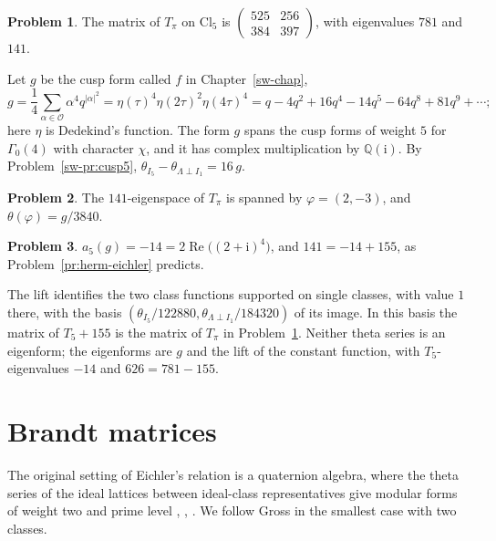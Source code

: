 \documentclass[reqno]{amsart}
\newcounter{chap}
\theoremstyle{definition}
\newtheorem{problem}{Problem}[section]
\theoremstyle{plain}
\newcommand{\Q}{\mathbb{Q}}
\newcommand{\ii}{\mathrm{i}}
\newcommand{\Oc}{\mathcal{O}}
\newcommand{\Cl}{\mathrm{Cl}}
\begin{document}
\begin{problem}\label{pr:herm-brandt}
The matrix of \(T_\pi\) on \(\Cl_5\) is \(\begin{pmatrix} 525 & 256 \\ 384 & 397 \end{pmatrix}\), with eigenvalues \(781\) and \(141\).
\end{problem}

Let \(g\) be the cusp form called \(f\) in Chapter~\ref{sw-chap}, 
\[
  g = \frac14\sum_{\alpha \in \Oc}\alpha^4 q^{\lvert\alpha\rvert^2} = \eta(\tau)^4\eta(2\tau)^2\eta(4\tau)^4 = q - 4q^2 + 16q^4 - 14q^5 - 64q^8 + 81q^9 + \cdots ;
\]
here \(\eta\) is Dedekind's function.  The form \(g\) spans the cusp forms of weight \(5\) for \(\Gamma_0(4)\) with character \(\chi\), and it has complex multiplication by \(\Q(\ii)\).  By Problem~\ref{sw-pr:cusp5}, \(\theta_{I_5} - \theta_{\Lambda \perp I_1} = 16\,g\).

\begin{problem}\label{pr:herm-theta}
The \(141\)-eigenspace of \(T_\pi\) is spanned by \(\varphi = (2, -3)\), and \(\theta(\varphi) = g/3840\).
\end{problem}

\begin{problem}\label{pr:herm-check}
\(a_5(g) = -14 = 2\operatorname{Re}\bigl((2+\ii)^4\bigr)\), and \(141 = -14 + 155\), as Problem~\ref{pr:herm-eichler} predicts.
\end{problem}

The lift identifies the two class functions supported on single classes, with value \(1\) there, with the basis \((\theta_{I_5}/122880,\theta_{\Lambda\perp I_1}/184320)\) of its image.  In this basis the matrix of \(T_5+155\) is the matrix of \(T_\pi\) in Problem~\ref{pr:herm-brandt}.  Neither theta series is an eigenform; the eigenforms are \(g\) and the lift of the constant function, with \(T_5\)-eigenvalues \(-14\) and \(626 = 781 - 155\).


\section{Brandt matrices}\label{sec:brandt}

The original setting of Eichler's relation is a quaternion algebra, where the theta series of the ideal lattices between ideal-class representatives give modular forms of weight two and prime level \cite{Ei73}, \cite{Pi}, \cite{Gr}.  We follow Gross \cite[\S\S1--2]{Gr} in the smallest case with two classes.
\end{document}

